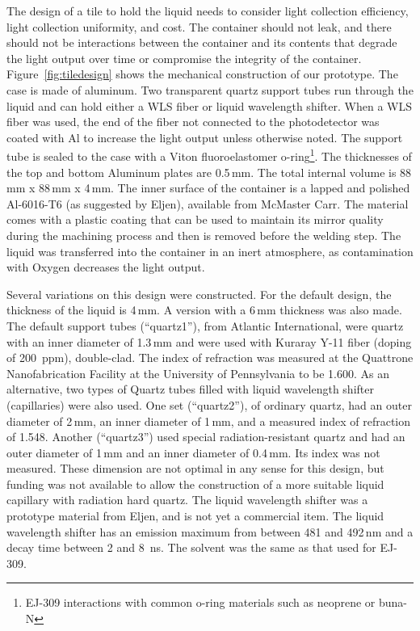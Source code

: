 \documentclass[review]{elsarticle}
\begin{document}
The design of a tile to hold the liquid needs to consider light
collection efficiency, light collection uniformity, and cost. The
container should not leak, and there should not be interactions
between the container and its contents that degrade the light output
over time or compromise the integrity of the
container. 
Figure~\ref{fig:tiledesign} shows the mechanical
construction of our prototype. The case is made of aluminum. Two
transparent quartz support tubes
run through the
liquid and can hold either a WLS fiber or liquid
wavelength shifter.
When a WLS fiber was
used, the end of the fiber not connected to the photodetector was
coated with Al to increase the light output unless otherwise
noted. The support tube is sealed to the case with a Viton
fluoroelastomer o-ring\footnote{EJ-309 interactions with common o-ring materials
such as neoprene or buna-N}. 
The thicknesses of the top and bottom Aluminum
plates are 0.5\,mm. The total internal volume is 88\,mm x 88\,mm x
4\,mm. The inner surface of the container is a lapped and polished
Al-6016-T6 (as suggested by Eljen),  available from McMaster Carr. The material comes with a
plastic coating that can be used to maintain its mirror quality during
the machining process and then is removed before the welding step. The
liquid was transferred into the container in an inert atmosphere, as
contamination with Oxygen decreases the light output.

Several variations on this design were constructed. For the default
design, the thickness of the liquid is 4\,mm. A version with a 6\,mm
thickness was also made. The default
support tubes (``quartz1''), from Atlantic International, were quartz with an inner
diameter of 1.3\,mm and were used with Kuraray Y-11 fiber (doping of
200~ppm), double-clad.
The index of refraction was measured at the Quattrone
Nanofabrication Facility at the University of Pennsylvania to be
1.600.
As an alternative, two types of
Quartz tubes filled with liquid wavelength
shifter (capillaries) were also used.  
One set (``quartz2''), of ordinary quartz, had an outer diameter of 2\,mm,
an inner diameter of 1\,mm, and a measured index of refraction of 1.548.
Another (``quartz3'') used special radiation-resistant quartz and had an outer diameter of 1\,mm and an
inner diameter of 0.4\,mm.  Its index was not measured.
These dimension are not optimal in any sense for this design, but
funding was not available to allow the construction of a more
suitable liquid capillary with radiation hard quartz.
The liquid wavelength shifter was a prototype
material from Eljen, and is not yet a commercial item. The liquid
wavelength shifter has an emission maximum from between 481 and 492\,nm
and a decay time between 2 and 8~ns. The solvent was the same as that
used for EJ-309. 
\end{document}

